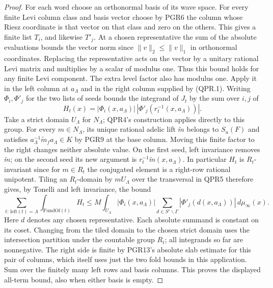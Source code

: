 \begin{proof}
For each word choose an orthonormal basis of its wave space. For
every finite Levi column class and basis vector choose by PGR6 the
column whose Riesz coordinate is that vector on that class and zero
on the others. This gives a finite list \(T_i\), and likewise
\(T'_j\). At a chosen representative the sum of the absolute
evaluations bounds the vector norm since \(\|v\|_2\le\|v\|_1\) in
orthonormal coordinates. Replacing the representative acts on the
vector by a unitary rational Levi matrix and multiplies by a scalar
of modulus one. Thus this bound holds for any finite Levi component.
The extra level factor also has modulus one. Apply it in the left
column at \(a_\Lambda\) and in the right column supplied by (QPR.1).
Writing \(\Phi_i,\Phi'_j\) for the two lists of seeds bounds the
integrand of \(J_t\) by the sum over \(i,j\) of
\[
 H_t(x)=|\Phi_i(x,a_\Lambda)|\,
        |\Phi'_j(r_t^{-1}(x,a_\Lambda))|.
\]
Take a strict domain \(U_\Lambda\) for \(N_\Lambda\); QPR4's
construction applies directly to this group. For every \(m\in
N_\Lambda\), its unique rational adelic lift \(\tilde m\) belongs
to \(S_u(F)\) and satisfies \(a_\Lambda^{-1}\tilde m_f a_\Lambda\in K\)
by PGR9 at the base column. Moving this finite factor to the right
changes neither absolute value. On the first seed, left invariance
removes \(\tilde m\); on the second seed its new argument is
\(r_t^{-1}\tilde m(x,a_\Lambda)\). In particular \(H_t\) is
\(R_t\)-invariant since for \(m\in R_t\) the conjugated element is
a right-row rational unipotent. Tiling an \(R_t\)-domain by
\(m U_\Lambda\) over the transversal in QPR5 therefore gives, by
Tonelli and left invariance, the bound
\[
 \sum_{t:\,\mathrm{left}(t)=\Lambda}
      \int_{\mathrm{FundOf}(t)} H_t
 \le M\!\int_{U_\Lambda}\!|\Phi_i(x,a_\Lambda)|
        \sum_{d\in S'\backslash\Gamma}
             |\Phi'_j(d(x,a_\Lambda))|\,d\mu_\infty(x).
\]
Here \(d\) denotes any chosen representative. Each absolute
summand is constant on its coset. Changing from the tiled domain
to the chosen strict domain uses the intersection partition under
the countable group \(R_t\); all integrands so far are nonnegative.
The right side is finite by PGR13's absolute slab estimate for this
pair of columns, which itself uses just the two fold bounds in this
application. Sum over the finitely many left rows and basis columns.
This proves the displayed all-term bound, also when either basis is
empty.
\end{proof}

